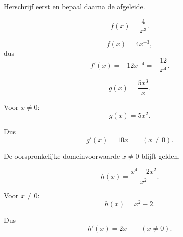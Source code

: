 \documentclass{ximera}
\begin{document}
\begin{oefening}{\oefB\ESS}

Herschrijf eerst en bepaal daarna de afgeleide.

\begin{question}
\[
f(x)=\frac{4}{x^3}.
\]

\begin{oplossing}
\[
f(x)=4x^{-3},
\]
dus
\[
\boxed{
f'(x)=-12x^{-4}=-\frac{12}{x^4}
}.
\]
\end{oplossing}
\end{question}


\begin{question}
\[
g(x)=\frac{5x^3}{x}.
\]

\begin{oplossing}
Voor $x\neq0$:
\[
g(x)=5x^2.
\]

Dus
\[
\boxed{g'(x)=10x\qquad(x\neq0)}.
\]

De oorspronkelijke domeinvoorwaarde $x\neq0$ blijft gelden.
\end{oplossing}
\end{question}


\begin{question}
\[
h(x)=\frac{x^4-2x^2}{x^2}.
\]

\begin{oplossing}
Voor $x\neq0$:
\[
h(x)=x^2-2.
\]

Dus
\[
\boxed{h'(x)=2x\qquad(x\neq0)}.
\]
\end{oplossing}
\end{question}

\end{oefening}


\end{document}
